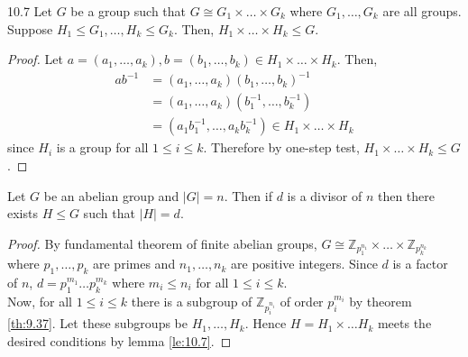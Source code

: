 \documentclass[12pt]{article}
\newcommand{\Z}{\mathbb{Z}}
\newcommand{\inv}{^{-1}}
\begin{document}
	\begin{mylem}{}{10.7}
		Let $G$ be a group such that $G\cong G_1\times\dots\times G_k$ where $G_1, \dots, G_k$ are all groups. Suppose $H_1\leq G_1, \dots, H_k\leq G_k$. Then, $H_1\times\dots\times H_k\leq G$.
		\begin{proof}
			Let $a=(a_1, \dots, a_k), b=(b_1, \dots, b_k)\in H_1\times\dots\times H_k$. Then,
			\begin{align*}
				ab\inv&=(a_1, \dots, a_k)(b_1, \dots, b_k)\inv\\
				&=(a_1, \dots, a_k)(b_1\inv, \dots, b_k\inv)\\
				&=(a_1b_1\inv, \dots, a_kb_k\inv)\in H_1\times\dots\times H_k
			\end{align*}
			since $H_i$ is a group for all $1\leq i\leq k$. Therefore by one-step test, $H_1\times\dots\times H_k\leq G$.
		\end{proof}
	\end{mylem}
	
	\begin{mycor}{}{}
		Let $G$ be an abelian group and $|G|=n$. Then if $d$ is a divisor of $n$ then there exists $H\leq G$ such that $|H|=d$.
		\begin{proof}		
			By fundamental theorem of finite abelian groups, $G\cong\Z_{p_1^{n_1}}\times\dots\times\Z_{p_k^{n_k}}$ where $p_1, \dots, p_k$ are primes and $n_1, \dots, n_k$ are positive integers. Since $d$ is a factor of $n$, $d=p_1^{m_1}\dots p_k^{m_k}$ where $m_i\leq n_i$ for all $1\leq i\leq k$.\\
			
			Now, for all $1\leq i\leq k$ there is a subgroup of $\Z_{p_i^{n_i}}$ of order $p_i^{m_i}$ by theorem \ref{th:9.37}. Let these subgroups be $H_1, \dots, H_k$. Hence $H=H_1\times\dots H_k$ meets the desired conditions by lemma \ref{le:10.7}.
		\end{proof}
	\end{mycor}
	
\end{document}
